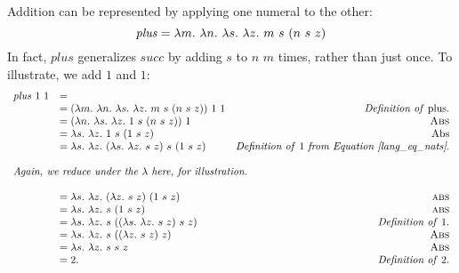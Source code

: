 \documentclass[12pt]{report}
\begin{document}
Addition can be represented by applying one numeral to the other:
\begin{equation}
  \mathit{plus} = \lambda m.\ \lambda n.\ \lambda s.\ \lambda z.\ m\ s\ (n\ s\ z)
\end{equation}
In fact, $\mathit{plus}$ generalizes $\mathit{succ}$ by adding $s$ to
$n$ $m$ times, rather than just once. To illustrate, we add
$1$ and $1$:
\begin{equation*}
  \begin{array}{llr}
    \lamApp{\mathit{plus}}{\lamApp{1}{1}} &= \\
    &= \lamAppP{\lamPlus}{\lamApp{1}{1}} & \text{\emph{Definition of} plus}. \\
    &= \lamAppP{\lamAbs{n}{\lamAbs{s}{\lamAbs{z}{\lamApp{1}{\lamApPp{s}{\lamApp{n}{\lamApp{s}{z}}}}}}}}{1} & \text{\sc Abs} \\
    &= \lamAbs{s}{\lamAbs{z}{\lamApp{1}{\lamApPp{s}{\lamApp{1}{\lamApp{s}{z}}}}}} & \text{Abs} \\
    &= \lamAbs{s}{\lamAbs{z}{\lamApp{(\lamAbs{s}{\lamAbs{z}{\lamApp{s}{z}}})}{\lamApPp{s}{\lamApp{1}{\lamApp{s}{z}}}}}} & \text{\emph{Definition of}\ 1 \emph{from Equation~\ref{lang_eq_nats}}.} \\ \\
    \multicolumn{3}{l}{\emph{Again, we reduce under the $\lambda$ here, for illustration.}} \\ \\
    &= \lamAbs{s}{\lamAbs{z}{\lamApp{(\lamAbs{z}{\lamApp{s}{z}})}{(\lamApp{1}{\lamApp{s}{z}})}}} & \text{\sc abs} \\

    &= \lamAbs{s}{\lamAbs{z}{\lamApp{s}{(\lamApp{1}{\lamApp{s}{z}})}}} & \text{\sc abs} \\
    &= \lamAbs{s}{\lamAbs{z}{\lamApp{s}{(\lamApp{(\lamAbs{s}{\lamAbs{z}{\lamApp{s}{z}}})}{\lamApp{s}{z}})}}} & \text{\emph{Definition of}\ 1.} \\
    &= \lamAbs{s}{\lamAbs{z}{\lamApp{s}{(\lamApp{(\lamAbs{z}{\lamApp{s}{z}})}{z})}}} & \text{\sc Abs} \\
    &= \lamAbs{s}{\lamAbs{z}{\lamApp{s}{\lamApp{s}{z}}}} & \text{\sc Abs} \\
    &= 2. & \text{\emph{Definition of}\ 2.}
  \end{array}
\end{equation*}

\end{document}
